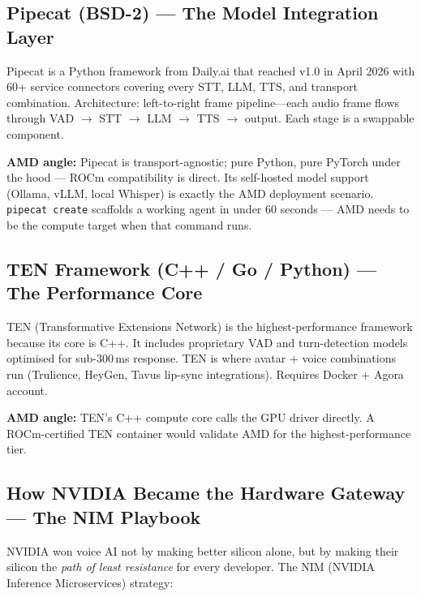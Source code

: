 \documentclass[12pt,a4paper]{article}
\begin{document}
\subsection{Pipecat (BSD-2) --- The Model Integration Layer}

Pipecat is a Python framework from Daily.ai that reached v1.0 in April 2026
with 60+ service connectors covering every STT, LLM, TTS, and transport
combination.  Architecture: left-to-right frame pipeline---each audio frame
flows through VAD $\to$ STT $\to$ LLM $\to$ TTS $\to$ output.  Each stage
is a swappable component.

\textbf{AMD angle:} Pipecat is transport-agnostic; pure Python, pure PyTorch
under the hood --- ROCm compatibility is direct.  Its self-hosted model
support (Ollama, vLLM, local Whisper) is exactly the AMD deployment scenario.
\texttt{pipecat create} scaffolds a working agent in under 60 seconds ---
AMD needs to be the compute target when that command runs.

\subsection{TEN Framework (C++ / Go / Python) --- The Performance Core}

TEN (Transformative Extensions Network) is the highest-performance framework
because its core is C++.  It includes proprietary VAD and turn-detection
models optimised for sub-300\,ms response.  TEN is where avatar + voice
combinations run (Trulience, HeyGen, Tavus lip-sync integrations).  Requires
Docker + Agora account.

\textbf{AMD angle:} TEN's C++ compute core calls the GPU driver directly.
A ROCm-certified TEN container would validate AMD for the
highest-performance tier.

\subsection{How NVIDIA Became the Hardware Gateway --- The NIM Playbook}

NVIDIA won voice AI not by making better silicon alone, but by making their
silicon the \emph{path of least resistance} for every developer.  The NIM
(NVIDIA Inference Microservices) strategy:
\end{document}
